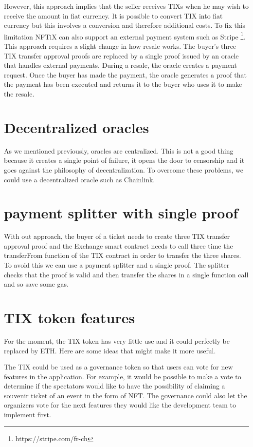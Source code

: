 \documentclass[a4paper,11pt,oneside]{report}
\begin{document}
However, this approach implies that the seller receives TIXs when he may wish to receive the amount in fiat currency. It is possible to convert TIX into fiat currency but this involves a conversion and therefore additional costs. To fix this limitation NFTiX can also support an external payment system such as Stripe \footnote{https://stripe.com/fr-ch}. This approach requires a slight change in how resale works. The buyer's three TIX transfer approval proofs are replaced by a single proof issued by an oracle that handles external payments. During a resale, the oracle creates a payment request. Once the buyer has made the payment, the oracle generates a proof that the payment has been executed and returns it to the buyer who uses it to make the resale.

\section{Decentralized oracles}
As we mentioned previously, oracles are centralized. This is not a good thing because it creates a single point of failure, it opens the door to censorship and it goes against the philosophy of decentralization. To overcome these problems, we could use a decentralized oracle such as Chainlink.

\section{payment splitter with single proof}
With out approach, the buyer of a ticket needs to create three TIX transfer approval proof and the Exchange smart contract needs to call three time the transferFrom function of the TIX contract in order to transfer the three shares. To avoid this we can use a payment splitter and a single proof. The splitter checks that the proof is valid and then transfer the shares in a single function call and so save some gas. 

\section{TIX token features}
For the moment, the TIX token has very little use and it could perfectly be replaced by ETH. Here are some ideas that might make it more useful.

The TIX could be used as a governance token so that users can vote for new features in the application. For example, it would be possible to make a vote to determine if the spectators would like to have the possibility of claiming a souvenir ticket of an event in the form of NFT. The governance could also let the organizers vote for the next features they would like the development team to implement first.
\end{document}
